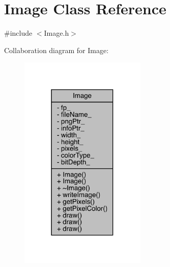 \hypertarget{class_image}{}\section{Image Class Reference}
\label{class_image}


{\ttfamily \#include $<$Image.\+h$>$}



Collaboration diagram for Image\+:\nopagebreak
\begin{figure}[H]
\begin{center}
\leavevmode
\includegraphics[width=171pt]{class_image__coll__graph}
\end{center}
\end{figure}
